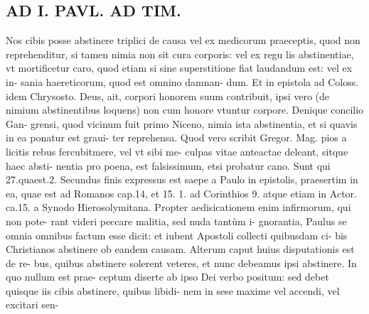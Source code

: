 \documentclass{article}
\begin{document}
\begin{pages}
\section*{AD I. PAVL. AD TIM. }
\marginpar{[ p.310. ]}\pstart Nos cibis posse abstinere triplici de causa vel ex medicorum praeceptis, quod non reprehenditur, si tamen nimia non sit cura corporis: vel ex regu lis abstinentiae, vt mortificetur caro, quod etiam si sine superstitione fiat laudandum est: vel ex in- sania haereticorum, quod est omnino damnan- dum. Et in epistola ad Coloss. idem Chrysosto. Deus, ait, corpori honorem suum contribuit, ipsi vero (de nimium abstinentibus loquens) non cum honore vtuntur corpore. Denique concilio Gan- grensi, quod vicinum fuit primo Niceno, nimia ista abstinentia, et si quavis in ea ponatur est graui- ter reprehensa. Quod vero scribit Gregor. Mag. pios a licitis rebus fercubitmere, vel vt sibi me- culpas vitae anteactae deleant, sitque haec absti- nentia pro poena, est falsissimum, etsi probatur cano. Sunt qui 27.quaest.2.  \pend\pstart Secundus finis expressus est saepe a Paulo in epistolis, praesertim in ea, quae est ad Romanos cap.14, et 15. 1. ad Corinthios 9. atque etiam in Actor. ca.15. a Synodo Hierosolymitana. Propter aedisicationem enim infirmorum, qui non pote- rant videri peccare malitia, sed nuda tantùm i- gnorantia, Paulus se omnia omnibus factum esse dicit: et iubent Apostoli collecti quibusdam ci- bis Christianos abstinere ob eandem causam.  \pend\pstart Alterum caput huius disputationis est de re- bus, quibus abstinere solerent veteres, et nunc debeamus ipsi abstinere. In quo nullum est prae- ceptum diserte ab ipso Dei verbo positum: sed debet quisque iis cibis abstinere, quibus libidi- nem in sese maxime vel accendi, vel excitari sen-  \pend

\end{pages}
\end{document}
